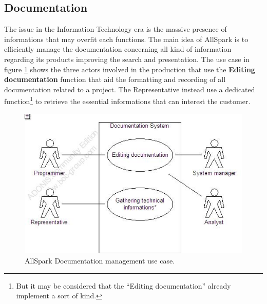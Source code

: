 \subsection{Documentation}
The issue in the Information Technology era is the massive presence of informations that may overfit each functions. The main idea of AllSpark is to efficiently manage the documentation concerning all kind of information regarding its products improving the search and presentation. The use case in figure \ref{2img:[use]documentation} shows the three actors involved in the production that use the \textbf{Editing documentation} function that aid the formatting and recording of all documentation related to a project. The Representative instead use a dedicated function\footnote{But it may be considered that the ``Editing documentation'' already implement a sort of kind.} to retrieve the essential informations that can interest the customer.

\begin{figure}
\begin{centering}
\includegraphics[scale=0.45]{assign3/adonis/imgs/documentation.jpg}
\caption{AllSpark Documentation management use case.}
\label{2img:[use]documentation}
\end{centering}
\end{figure}